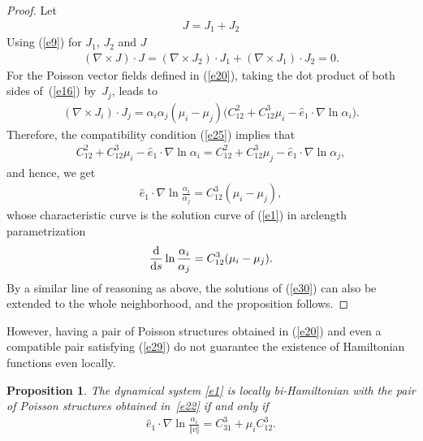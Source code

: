 \documentclass[pdftex]{sigma}
\numberwithin{equation}{section}
\newtheorem{Proposition}[Theorem]{Proposition}
 { \theoremstyle{definition}
\newtheorem{Definition}[Theorem]{Definition} }
\begin{document}
\begin{proof} Let
\begin{gather*}
J=J_{1}+J_{2}
\end{gather*}
Using (\ref{e9}) for $J_{1}$, $J_{2}$ and $J$
\begin{gather}
( \nabla \times J) \cdot J=( \nabla \times J_{2})\cdot J_{1}+ ( \nabla \times J_{1} ) \cdot J_{2}=0. \label{e25}
\end{gather}
For the Poisson vector f\/ields def\/ined in (\ref{e20}), taking the dot product of both sides of~(\ref{e16}) by~$J_{j}$, leads to
\begin{gather}
( \nabla \times J_{i}) \cdot J_{j}=\alpha _{i}\alpha_{j} (\mu _{i}-\mu _{j} ) \big( C_{12}^{2}+C_{12}^{3}\mu _{i}-\widehat{e}_{1}\cdot \nabla \ln \alpha _{i}\big). \label{e27}
\end{gather}
Therefore, the compatibility condition (\ref{e25}) implies that
\begin{gather*}
C_{12}^{2}+C_{12}^{3}\mu _{i}-\widehat{e}_{1}\cdot \nabla \ln \alpha_{i}=C_{12}^{2}+C_{12}^{3}\mu _{j}-\widehat{e}_{1}\cdot \nabla \ln \alpha_{j},
\end{gather*}
and hence, we get
\begin{gather}
\widehat{e}_{1}\cdot \nabla \ln \frac{\alpha _{i}}{\alpha _{j}}=C_{12}^{3}( \mu _{i}-\mu _{j}), \label{e29}
\end{gather}
whose characteristic curve is the solution curve of (\ref{e1}) in arclength parametrization
\begin{gather}
\frac{{\rm d}}{{\rm d}s}\ln \frac{\alpha _{i}}{\alpha _{j}}=C_{12}^{3} ( \mu_{i}-\mu _{j} ). \label{e30}
\end{gather}
By a similar line of reasoning as above, the solutions of (\ref{e30}) can also be extended to the whole neighborhood, and the proposition follows.
\end{proof}

However, having a pair of Poisson structures obtained in (\ref{e20}) and even a compatible pair satisfying (\ref{e29}) do not guarantee the existence of Hamiltonian functions even locally.

\begin{Proposition}\label{proposition3}
The dynamical system \eqref{e1} is locally bi-Hamiltonian with the pair of Poisson structures obtained in~\eqref{e22} if and only if
\begin{gather}
\widehat{e}_{1}\cdot \nabla \ln \frac{\alpha _{i}}{\Vert v\Vert }=C_{31}^{3}+\mu _{i}C_{12}^{3}. \label{e31}
\end{gather}
\end{Proposition}
\end{document}
